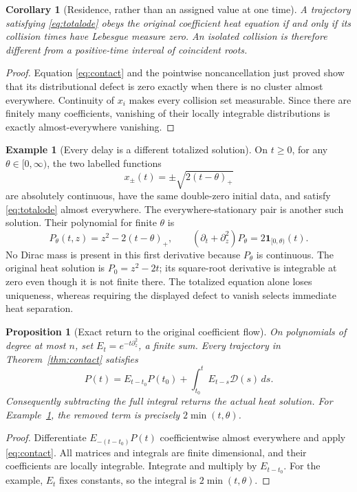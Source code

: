 \documentclass[11pt,a4paper]{article}
\newtheorem{proposition}[theorem]{Proposition}
\newtheorem{corollary}[theorem]{Corollary}
\theoremstyle{definition}
\newtheorem{example}[theorem]{Example}
\begin{document}
\begin{corollary}[Residence, rather than an assigned value at one time]\label{cor:residence}
A trajectory satisfying \eqref{eq:totalode} obeys the original coefficient heat equation if and only if its collision times have Lebesgue measure zero. An isolated collision is therefore different from a positive-time interval of coincident roots.
\end{corollary}
\begin{proof}
Equation \eqref{eq:contact} and the pointwise noncancellation just proved show that its distributional defect is zero exactly when there is no cluster almost everywhere. Continuity of $x_i$ makes every collision set measurable. Since there are finitely many coefficients, vanishing of their locally integrable distributions is exactly almost-everywhere vanishing.
\end{proof}

\begin{example}[Every delay is a different totalized solution]\label{ex:delay}
On $t\ge0$, for any $\theta\in[0,\infty)$, the two labelled functions
\[
 x_\pm(t)=\pm\sqrt{2(t-\theta)_+}
\]
are absolutely continuous, have the same double-zero initial data, and satisfy \eqref{eq:totalode} almost everywhere. The everywhere-stationary pair is another such solution. Their polynomial for finite $\theta$ is
\[
 P_\theta(t,z)=z^2-2(t-\theta)_+,
 \qquad (\partial_t+\partial_z^2)P_\theta
 =2\mathbf1_{[0,\theta)}(t).
\]
No Dirac mass is present in this first derivative because $P_\theta$ is continuous. The original heat solution is $P_0=z^2-2t$; its square-root derivative is integrable at zero even though it is not finite there. The totalized equation alone loses uniqueness, whereas requiring the displayed defect to vanish selects immediate heat separation.
\end{example}

\begin{proposition}[Exact return to the original coefficient flow]\label{prop:duhamel}
On polynomials of degree at most $n$, set $E_t=e^{-t\partial_z^2}$, a finite sum. Every trajectory in Theorem~\ref{thm:contact} satisfies
\begin{equation}\label{eq:duhamel}
 P(t)=E_{t-t_0}P(t_0)+
 \int_{t_0}^t E_{t-s}\mathcal D(s)\,ds.
\end{equation}
Consequently subtracting the full integral returns the actual heat solution. For Example~\ref{ex:delay}, the removed term is precisely $2\min(t,\theta)$.
\end{proposition}
\begin{proof}
Differentiate $E_{-(t-t_0)}P(t)$ coefficientwise almost everywhere and apply \eqref{eq:contact}. All matrices and integrals are finite dimensional, and their coefficients are locally integrable. Integrate and multiply by $E_{t-t_0}$. For the example, $E_t$ fixes constants, so the integral is $2\min(t,\theta)$.
\end{proof}
\end{document}
